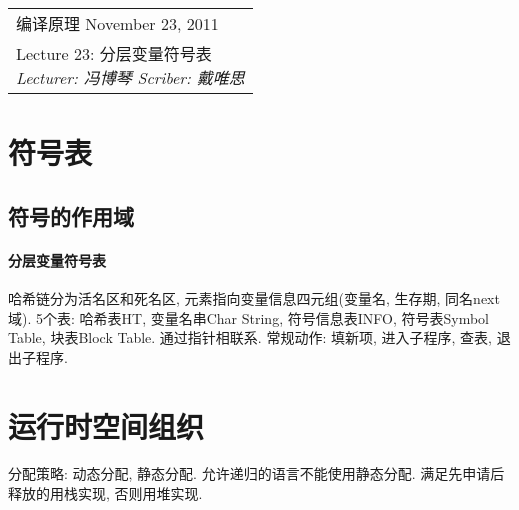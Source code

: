 \def\lecture{23}
\clearpage \noindent\begin{tabularx}{\linewidth}{|X|}
\hline \vskip -2mm
{\sf 编译原理} \hfill November 23, 2011 \\
{\centering \sf \large Lecture \lecture:
分层变量符号表 \\ }
\textsl{Lecturer: 冯博琴 \hfill Scriber: 戴唯思}\\ \hline
\end{tabularx}
\setcounter{section}{0}
\renewcommand{\thepage}{\lecture -\arabic{page}}

\section{符号表}

    \subsection{符号的作用域}

        \paragraph{分层变量符号表} 哈希链分为活名区和死名区, 元素指向变量信息四元组(变量名, 生存期, 同名next域). 5个表: 哈希表HT, 变量名串Char String, 符号信息表INFO, 符号表Symbol Table, 块表Block Table. 通过指针相联系. 常规动作: 填新项, 进入子程序, 查表, 退出子程序.

\section{运行时空间组织}

    分配策略: 动态分配, 静态分配. 允许递归的语言不能使用静态分配. 满足先申请后释放的用栈实现, 否则用堆实现.
